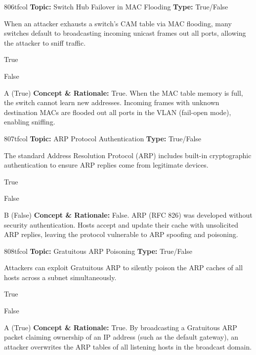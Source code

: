 \begin{qcard}{806}{tfcol}
\textcolor{darkslate!75}{\small\textbf{Topic:} Switch Hub Failover in MAC Flooding \hfill \textbf{Type:} True/False}\vspace{0.4em}\par
When an attacker exhausts a switch's CAM table via MAC flooding, many switches default to broadcasting incoming unicast frames out all ports, allowing the attacker to sniff traffic.
\begin{qoptions}
\item True
\item False
\end{qoptions}
\end{qcard}
\nopagebreak
\begin{explainbox}{A (True)}
\textbf{Concept \& Rationale:} True. When the MAC table memory is full, the switch cannot learn new addresses. Incoming frames with unknown destination MACs are flooded out all ports in the VLAN (fail-open mode), enabling sniffing.
\end{explainbox}

\begin{qcard}{807}{tfcol}
\textcolor{darkslate!75}{\small\textbf{Topic:} ARP Protocol Authentication \hfill \textbf{Type:} True/False}\vspace{0.4em}\par
The standard Address Resolution Protocol (ARP) includes built-in cryptographic authentication to ensure ARP replies come from legitimate devices.
\begin{qoptions}
\item True
\item False
\end{qoptions}
\end{qcard}
\nopagebreak
\begin{explainbox}{B (False)}
\textbf{Concept \& Rationale:} False. ARP (RFC 826) was developed without security authentication. Hosts accept and update their cache with unsolicited ARP replies, leaving the protocol vulnerable to ARP spoofing and poisoning.
\end{explainbox}

\begin{qcard}{808}{tfcol}
\textcolor{darkslate!75}{\small\textbf{Topic:} Gratuitous ARP Poisoning \hfill \textbf{Type:} True/False}\vspace{0.4em}\par
Attackers can exploit Gratuitous ARP to silently poison the ARP caches of all hosts across a subnet simultaneously.
\begin{qoptions}
\item True
\item False
\end{qoptions}
\end{qcard}
\nopagebreak
\begin{explainbox}{A (True)}
\textbf{Concept \& Rationale:} True. By broadcasting a Gratuitous ARP packet claiming ownership of an IP address (such as the default gateway), an attacker overwrites the ARP tables of all listening hosts in the broadcast domain.
\end{explainbox}

